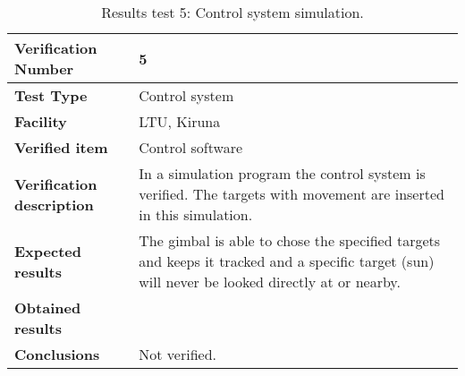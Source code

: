 \begin{table}[H]
\centering

\begin{tabular}{|m{}| m{} |}
\hline
\textbf{Verification Number} 		& 5 				\\ \hline
\textbf{Test Type} 					& Control system	\\ \hline
\textbf{Facility} 					& LTU, Kiruna 		\\ \hline
\textbf{Verified item} 				& Control software 	\\ \hline

\textbf{Verification description} 	& In a simulation program the control system is verified. The targets with movement are inserted in this simulation.\\ \hline

\textbf{Expected results} 			& The gimbal is able to chose the specified targets and keeps it tracked and a specific target (sun) will never be looked directly at or nearby. \\ \hline

\textbf{Obtained results} 			& \\ \hline

\textbf{Conclusions} 				& Not verified.		\\ \hline
\end{tabular}
\caption{Results test 5: Control system simulation.}
\label{tab:testresult5:control}
\end{table}


\raggedbottom